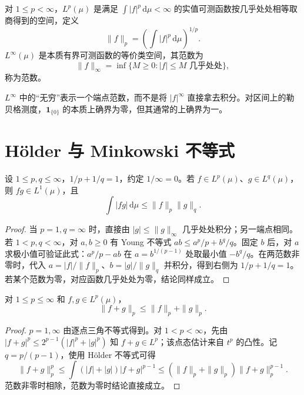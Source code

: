 \documentclass[UTF8,12pt,a4paper,fontset=fandol]{ctexbook}
\begin{document}
\begin{definition}
对 $1\leq p<\infty$，$L^p(\mu)$ 是满足 $\int|f|^p\,\mathrm d\mu<\infty$ 的实值可测函数按几乎处处相等取商得到的空间，定义
\[
 \|f\|_p=\left(\int|f|^p\,\mathrm d\mu\right)^{1/p}.
\]
$L^\infty(\mu)$ 是本质有界可测函数的等价类空间，其范数为
\[
 \|f\|_\infty=\inf\{M\geq0:|f|\leq M\text{ 几乎处处}\},
\]
称为范数。
\end{definition}
$L^\infty$ 中的“无穷”表示一个端点范数，而不是将 $|f|^\infty$ 直接拿去积分。对区间上的勒贝格测度，$\mathbf1_{\{0\}}$ 的本质上确界为零，但其通常的上确界为一。

\section{Hölder 与 Minkowski 不等式}
\begin{theorem}
设 $1\leq p,q\leq\infty$，$1/p+1/q=1$，约定 $1/\infty=0$。若 $f\in L^p(\mu)$、$g\in L^q(\mu)$，则 $fg\in L^1(\mu)$，且
\begin{equation}
 \int|fg|\,\mathrm d\mu\leq\|f\|_p\|g\|_q.
 \label{eq:mt-holder}
\end{equation}
\end{theorem}
\begin{proof}
当 $p=1,q=\infty$ 时，直接由 $|g|\leq\|g\|_\infty$ 几乎处处积分；另一端点相同。若 $1<p,q<\infty$，对 $a,b\geq0$ 有 Young 不等式 $ab\leq a^p/p+b^q/q$。固定 $b$ 后，对 $a$ 求极小值可验证此式：$a^p/p-ab$ 在 $a=b^{1/(p-1)}$ 处取最小值 $-b^q/q$。在两范数非零时，代入 $a=|f|/\|f\|_p$、$b=|g|/\|g\|_q$ 并积分，得到右侧为 $1/p+1/q=1$。若某个范数为零，对应函数几乎处处为零，结论同样成立。
\end{proof}

\begin{theorem}
对 $1\leq p\leq\infty$ 和 $f,g\in L^p(\mu)$，
\begin{equation}
 \|f+g\|_p\leq\|f\|_p+\|g\|_p.
 \label{eq:mt-minkowski}
\end{equation}
\end{theorem}
\begin{proof}
$p=1,\infty$ 由逐点三角不等式得到。对 $1<p<\infty$，先由
$|f+g|^p\leq2^{p-1}(|f|^p+|g|^p)$ 知 $f+g\in L^p$；该点态估计来自 $t^p$ 的凸性。记 $q=p/(p-1)$，使用 Hölder 不等式可得
\[
 \|f+g\|_p^p
 \leq\int(|f|+|g|)|f+g|^{p-1}
 \leq(\|f\|_p+\|g\|_p)\|f+g\|_p^{p-1}.
\]
范数非零时相除，范数为零时结论直接成立。
\end{proof}
\end{document}
